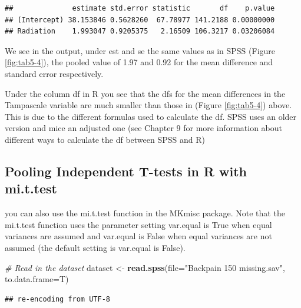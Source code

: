 \documentclass[]{book}
\newenvironment{Shaded}{\begin{snugshade}}{\end{snugshade}}
\newcommand{\KeywordTok}[1]{\textcolor[rgb]{0.13,0.29,0.53}{\textbf{#1}}}
\newcommand{\DataTypeTok}[1]{\textcolor[rgb]{0.13,0.29,0.53}{#1}}
\newcommand{\StringTok}[1]{\textcolor[rgb]{0.31,0.60,0.02}{#1}}
\newcommand{\CommentTok}[1]{\textcolor[rgb]{0.56,0.35,0.01}{\textit{#1}}}
\newcommand{\NormalTok}[1]{#1}
\begin{document}
\begin{verbatim}
##              estimate std.error statistic       df    p.value
## (Intercept) 38.153846 0.5628260  67.78977 141.2188 0.00000000
## Radiation    1.993047 0.9205375   2.16509 106.3217 0.03206084
\end{verbatim}

We see in the output, under est and se the same values as in SPSS
(Figure \ref{fig:tab5-4}), the pooled value of 1.97 and 0.92 for the
mean difference and standard error respectively.

Under the column df in R you see that the dfs for the mean differences
in the Tampascale variable are much smaller than those in (Figure
\ref{fig:tab5-4}) above. This is due to the different formulas used to
calculate the df. SPSS uses an older version and mice an adjusted one
(see Chapter 9 for more information about different ways to calculate
the df between SPSS and R)

\subsection{Pooling Independent T-tests in R with
mi.t.test}\label{pooling-independent-t-tests-in-r-with-mi.t.test}

you can also use the mi.t.test function in the MKmisc package. Note that
the mi.t.test function uses the parameter setting var.equal is True when
equal variances are assumed and var.equal is False when equal variances
are not assumed (the default setting is var.equal is False).

\begin{Shaded}
\begin{Highlighting}[]
\CommentTok{# Read in the dataset}
\NormalTok{dataset <-}\StringTok{ }\KeywordTok{read.spss}\NormalTok{(}\DataTypeTok{file=}\StringTok{"Backpain 150 missing.sav"}\NormalTok{, }\DataTypeTok{to.data.frame=}\NormalTok{T)}
\end{Highlighting}
\end{Shaded}

\begin{verbatim}
## re-encoding from UTF-8
\end{verbatim}
\end{document}
